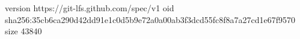 version https://git-lfs.github.com/spec/v1
oid sha256:35cb6ca290d42dd91e1c0d5b9e72a0a00ab3f3dcd55fc8f8a7a27cd1e67f9570
size 43840
